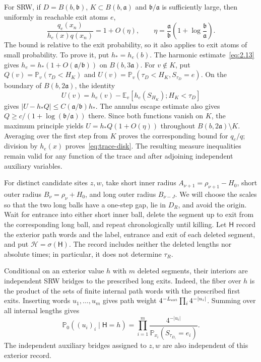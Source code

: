 \documentclass[11pt,letterpaper,reqno]{amsart}
\numberwithin{equation}{section}
\theoremstyle{remark}
\begin{document}
For SRW, if $D=B(b,\mathfrak b)$, $K\subset B(b,\mathfrak a)$ and $\mathfrak b/\mathfrak a$ is sufficiently large, then uniformly in reachable exit atoms $e$,
\begin{equation}\label{eq:trace-disk}
 \frac{q_e(x_n)}{h_e(x)q(x_n)}=1+O(\eta),\qquad
 \eta=\frac{\mathfrak a}{\mathfrak b}\left(1+\log\frac{\mathfrak b}{\mathfrak a}\right).
\end{equation}
The bound is relative to the exit probability, so it also applies to exit atoms of small probability. To prove it, put $h_*=h_e(b)$. The harmonic estimate~\eqref{eq:2.13} gives $h_e=h_*(1+O(\mathfrak a/\mathfrak b))$ on $B(b,3\mathfrak a)$. For $v\notin K$, put $Q(v)=\mathbb P_v(\tau_D<H_K)$ and $U(v)=\mathbb P_v(\tau_D<H_K,S_{\tau_D}=e)$. On the boundary of $B(b,2\mathfrak a)$, the identity
\[
 U(v)=h_e(v)-\mathbb E_v[h_e(S_{H_K});H_K<\tau_D]
\]
gives $|U-h_*Q|\le C(\mathfrak a/\mathfrak b)h_*$. The annulus escape estimate also gives $Q\ge c/(1+\log(\mathfrak b/\mathfrak a))$ there. Since both functions vanish on $K$, the maximum principle yields $U=h_*Q(1+O(\eta))$ throughout $B(b,2\mathfrak a)\setminus K$. Averaging over the first step from $K$ proves the corresponding bound for $q_e/q$; division by $h_e(x)$ proves~\eqref{eq:trace-disk}. The resulting measure inequalities remain valid for any function of the trace and after adjoining independent auxiliary variables.

For distinct candidate sites $z,w$, take short inner radius $A_{\nu+1}=\rho_{\nu+1}-H_0$, short outer radius $B_\nu=\rho_\nu+H_0$, and long outer radius $B_{\nu-J}$. We will choose the scales so that the two long balls have a one-step gap, lie in $D_R$, and avoid the origin. Wait for entrance into either short inner ball, delete the segment up to exit from the corresponding long ball, and repeat chronologically until killing. Let $\mathsf H$ record the exterior path words and the label, entrance and exit of each deleted segment, and put $\mathscr H=\sigma(\mathsf H)$. The record includes neither the deleted lengths nor absolute times; in particular, it does not determine $\tau_R$.

Conditional on an exterior value $h$ with $m$ deleted segments, their interiors are independent SRW bridges to the prescribed long exits. Indeed, the fiber over $h$ is the product of the sets of finite internal path words with the prescribed first exits. Inserting words $u_1,\ldots,u_m$ gives path weight $4^{-L_{\rm ext}}\prod_i4^{-|u_i|}$. Summing over all internal lengths gives
\begin{equation}\label{eq:exterior-fiber}
 \mathbb P_0((u_i)_i\mid\mathsf H=h)
 =\prod_{i=1}^m\frac{4^{-|u_i|}}{\mathbb P_{x_i}(S_{\tau_{D_i}}=e_i)}.
\end{equation}
The independent auxiliary bridges assigned to $z,w$ are also independent of this exterior record.
\end{document}
